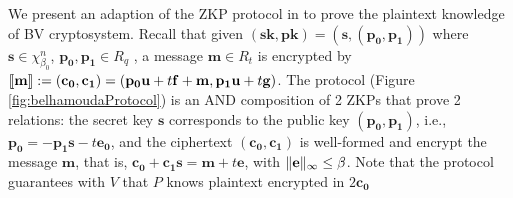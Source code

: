 We present an adaption of the ZKP protocol in \cite{benhamouda2014better} to
prove the plaintext knowledge of BV cryptosystem. Recall that given
$\mathbf{(sk,pk) = (s,(p_0,p_1))}$ where $\mathbf{s} \in \chi_{\beta_0}^n$,
$\mathbf{p_0,p_1} \in R_q$ , a message $\mathbf{m} \in R_t$ is encrypted by
$\left\llbracket\mathbf{m}\right\rrbracket := \mathbf{(c_0, c_1)} = (\mathbf{p_0u} + t\mathbf{f + m,
  p_1u} + t\mathbf{g)}$. The protocol (Figure \ref{fig:belhamoudaProtocol}) is
an AND composition of 2 ZKPs that prove 2 relations: the secret key $\mathbf{s}$
corresponds to the public key $\mathbf{(p_0,p_1)}$, i.e.,
$\mathbf{p_0 = -p_1s} - t\mathbf{e_0}$, and the ciphertext $\mathbf{(c_0,c_1)}$
is well-formed and encrypt the message $\mathbf{m}$, that is,
$\mathbf{c_0 + c_1s} = \mathbf{m} + t\mathbf{e}$, with
$\Vert \mathbf{e} \Vert_{\infty} \leq \beta$. Note that the protocol guarantees with $V$
that $P$ knows plaintext encrypted in $2\mathbf{c_0}$

